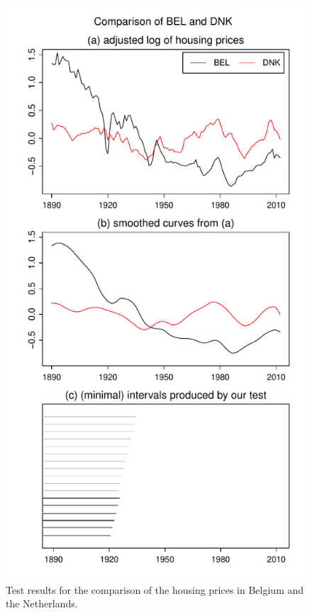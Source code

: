 \documentclass[a4paper,12pt]{article}
\begin{document}
\begin{figure}
\begin{minipage}[t]{0.24\textwidth}
\caption{Test results for the comparison of the housing prices in Belgium and the Netherlands.}\label{fig:hp:Belgium:Netherlands}
\end{minipage}
\hspace{0.1cm}
\begin{minipage}[t]{0.24\textwidth}
\includegraphics[width=\textwidth]{output/plots/hp/BEL_vs_DNK}

\end{minipage}
\end{figure}
\end{document}
